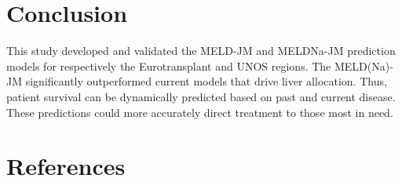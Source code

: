 \documentclass[11pt,english,]{book} %
\begin{document}
\hypertarget{conclusion-2}{%
\section*{Conclusion}\label{conclusion-2}}

This study developed and validated the MELD-JM and MELDNa-JM prediction models for respectively the Eurotransplant and UNOS regions. The MELD(Na)-JM significantly outperformed current models that drive liver allocation. Thus, patient survival can be dynamically predicted based on past and current disease. These predictions could more accurately direct treatment to those most in need.

\newpage
\linespread{1}
\small

\hypertarget{references-3}{%
\section*{References}\label{references-3}}
\end{document}
